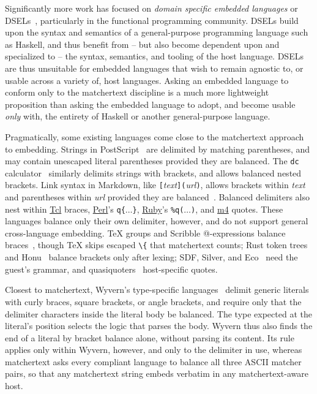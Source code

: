 Significantly more work has focused on
\emph{domain specific embedded languages}
or DSELs~\cite{hudak98modular},
particularly in the functional programming community.
DSELs build upon the syntax and semantics
of a general-purpose programming language such as Haskell,
and thus benefit from --
but also become dependent upon and specialized to --
the syntax, semantics, and tooling of the host language.
DSELs are thus unsuitable for embedded languages
that wish to remain agnostic to, or usable across a variety of,
host languages.
Asking an embedded language to conform only to the matchertext discipline
is a much more lightweight proposition than
asking the embedded language to adopt, and become usable \emph{only} with,
the entirety of Haskell or another general-purpose language.

Pragmatically,
some existing languages come close to the matchertext approach to embedding.
Strings in PostScript~\cite{adobe99postscript}
are delimited by matching parentheses,
and may contain unescaped literal parentheses provided they are balanced.
The \verb|dc| calculator~\cite{howard21dc}
similarly delimits strings with brackets,
and allows balanced nested brackets.
Link syntax
in Markdown,
like \verb|[|\emph{text}\verb|](|\emph{url}\verb|)|,
allows brackets within \emph{text}
and parentheses within \emph{url} provided they are balanced~\cite{macfarlane19commonmark}.
Balanced delimiters also nest within
\href{https://www.tcl-lang.org/man/tcl8.6/TclCmd/Tcl.htm}{Tcl} braces,
\href{https://perldoc.perl.org/perlop#Quote-and-Quote-like-Operators}{Perl}'s \verb|q{|$\dots$\verb|}|,
\href{https://docs.ruby-lang.org/en/master/syntax/literals_rdoc.html}{Ruby}'s \verb|%q(|$\dots$\verb|)|,
and \href{https://www.gnu.org/software/m4/manual/html_node/Quoted-strings.html}{m4} quotes.
These languages balance only their own delimiter, however,
and do not support general cross-language embedding.
\TeX{} groups and Scribble @-expressions balance braces~\cite{knuth84texbook,flatt09scribble},
though \TeX{} skips escaped \verb|\{| that matchertext counts;
Rust token trees and Honu~\cite{rafkind12honu} balance brackets only after lexing;
SDF, Silver, and Eco~\cite{heering89sdf,vanwyk07context,diekmann14eco} need the guest's grammar,
and quasiquoters~\cite{mainland07quoted} host-specific quotes.

Closest to matchertext,
Wyvern's type-specific languages~\cite{omar14safely}
delimit generic literals with curly braces, square brackets,
or angle brackets,
and require only that the delimiter characters
inside the literal body be balanced.
The type expected at the literal's position
selects the logic that parses the body.
Wyvern thus also finds the end of a literal by bracket balance alone,
without parsing its content.
Its rule applies only within Wyvern, however,
and only to the delimiter in use,
whereas matchertext asks every compliant language
to balance all three ASCII matcher pairs,
so that any matchertext string embeds verbatim
in any matchertext-aware host.

